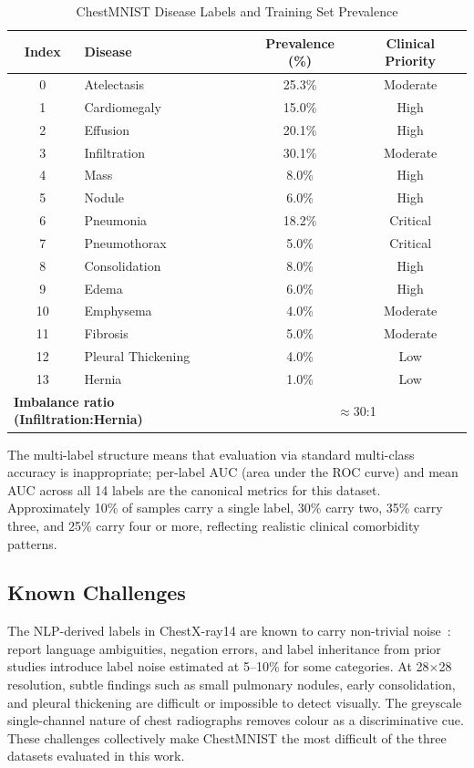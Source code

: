 \begin{table}[h]
\footnotesize
\centering
\caption{ChestMNIST Disease Labels and Training Set Prevalence}
\label{tab:chestmnist_classes}
\begin{tabular}{clcc}
\toprule
\textbf{Index} & \textbf{Disease} & \textbf{Prevalence (\%)} & \textbf{Clinical Priority} \\
\midrule
0  & Atelectasis       & 25.3\% & Moderate \\
1  & Cardiomegaly      & 15.0\% & High     \\
2  & Effusion          & 20.1\% & High     \\
3  & Infiltration      & 30.1\% & Moderate \\
4  & Mass              & 8.0\%  & High     \\
5  & Nodule            & 6.0\%  & High     \\
6  & Pneumonia         & 18.2\% & Critical \\
7  & Pneumothorax      & 5.0\%  & Critical \\
8  & Consolidation     & 8.0\%  & High     \\
9  & Edema             & 6.0\%  & High     \\
10 & Emphysema         & 4.0\%  & Moderate \\
11 & Fibrosis          & 5.0\%  & Moderate \\
12 & Pleural Thickening& 4.0\%  & Low      \\
13 & Hernia            & 1.0\%  & Low      \\
\midrule
\multicolumn{2}{l}{\textbf{Imbalance ratio (Infiltration:Hernia)}} & \multicolumn{2}{c}{$\approx$30:1} \\
\bottomrule
\end{tabular}
\end{table}

The multi-label structure means that evaluation via standard multi-class accuracy is inappropriate; per-label AUC (area under the ROC curve) and mean AUC across all 14 labels are the canonical metrics for this dataset. Approximately 10\% of samples carry a single label, 30\% carry two, 35\% carry three, and 25\% carry four or more, reflecting realistic clinical comorbidity patterns.

\subsection{Known Challenges}

The NLP-derived labels in ChestX-ray14 are known to carry non-trivial noise~\cite{rajpurkar2017chexnet}: report language ambiguities, negation errors, and label inheritance from prior studies introduce label noise estimated at 5--10\% for some categories. At 28$\times$28 resolution, subtle findings such as small pulmonary nodules, early consolidation, and pleural thickening are difficult or impossible to detect visually. The greyscale single-channel nature of chest radiographs removes colour as a discriminative cue. These challenges collectively make ChestMNIST the most difficult of the three datasets evaluated in this work.


